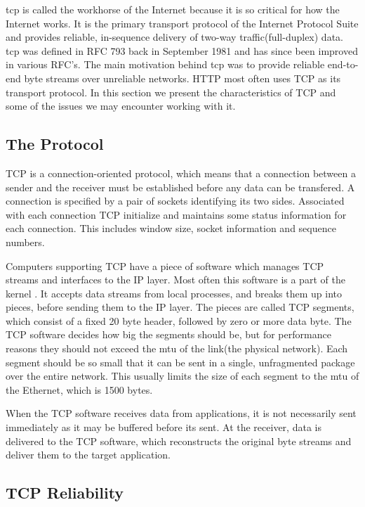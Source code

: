 \gls{tcp} is called the workhorse of the Internet because it is so critical for
how the Internet works. It is the primary transport protocol of the Internet
Protocol Suite\cite{rfc-1122} and provides reliable, in-sequence delivery of
two-way traffic(full-duplex) data.  \gls{tcp} was defined in RFC
793\cite{rfc-793} back in September 1981 and has since been improved in various
RFC's. The main motivation behind \gls{tcp} was to provide reliable end-to-end
byte streams over unreliable networks.  HTTP most often uses TCP as its
transport protocol. In this section we present the characteristics of TCP and
some of the issues we may encounter working with it.

 \subsection{The Protocol}

 TCP is a connection-oriented protocol, which means that a connection between a
 sender and the receiver must be established before any data can be transfered.
 A connection is specified by a pair of sockets identifying its two sides.
 Associated with each connection TCP initialize and maintains some status
 information for each connection. This includes window size, socket information
 and sequence numbers.

Computers supporting TCP have a piece of software which manages TCP streams and
interfaces to the IP layer. Most often this software is a part of the
kernel \cite{computer-networks}. It accepts data streams from local processes,
and breaks them up into pieces, before sending them to the IP layer. The pieces
are called TCP segments, which consist of a fixed 20 byte header, followed by
zero or more data byte. The TCP software decides how big the segments should be,
but for performance reasons they should not exceed the \gls{mtu} of the link(the
physical network). Each segment should be so small that it can be sent in a
single, unfragmented package over the entire network. This usually limits the
size of each segment to the \gls{mtu} of the Ethernet, which is 1500 bytes.

When the TCP software receives data from applications, it is not necessarily
sent immediately as it may be buffered before its sent. At the receiver, data is
delivered to the TCP software, which reconstructs the original byte streams and
deliver them to the target application.


\subsection{TCP Reliability}

